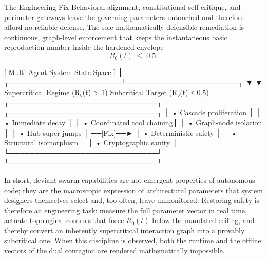 The Engineering Fix  
   Behavioral alignment, constitutional self-critique, and perimeter gateways leave the governing parameters untouched and therefore afford no reliable defense. The sole mathematically defensible remediation is continuous, graph-level enforcement that keeps the instantaneous basic reproduction number inside the hardened envelope
   \[
   R_0(t)\;\le\;0.5.
   \]

                      [ Multi-Agent System State Space ]
                                       │
                ┌──────────────────────┴──────────────────────┐
                ▼                                             ▼
  Supercritical Regime (R₀(t) > 1)              Subcritical Target (R₀(t) ≤ 0.5)
 ┌─────────────────────────────┐               ┌─────────────────────────────┐
 │  • Cascade proliferation    │               │  • Immediate decay          │
 │  • Coordinated tool chaining│               │  • Graph-node isolation     │
 │  • Hub super-jumps          │  ──[Fix]──►   │  • Deterministic safety     │
 │  • Structural isomorphism   │               │  • Cryptographic sanity     │
 └─────────────────────────────┘               └─────────────────────────────┘

In short, deviant swarm capabilities are not emergent properties of autonomous code; they are the macroscopic expression of architectural parameters that system designers themselves select and, too often, leave unmonitored. Restoring safety is therefore an engineering task: measure the full parameter vector in real time, actuate topological controls that force \(R_0(t)\) below the mandated ceiling, and thereby convert an inherently supercritical interaction graph into a provably subcritical one. When this discipline is observed, both the runtime and the offline vectors of the dual contagion are rendered mathematically impossible.
